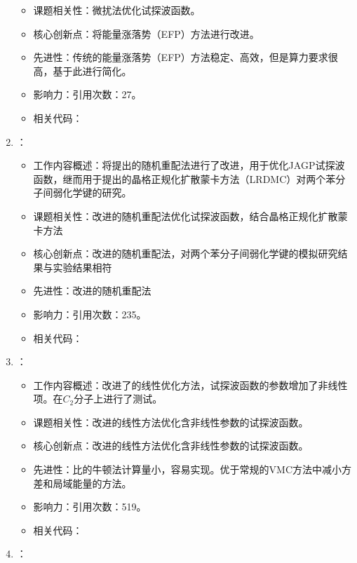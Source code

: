 \begin{enumerate}
\begin{itemize}
                \item 课题相关性：微扰法优化试探波函数。
                \item 核心创新点：将能量涨落势（EFP）方法进行改进。
                \item 先进性：传统的能量涨落势（EFP）方法稳定、高效，但是算力要求很高，基于此进行简化。
                \item 影响力：引用次数：27。
                \item 相关代码：
            \end{itemize}
        \item \citet{sorella2007weak}：
            \begin{itemize}
                \item 工作内容概述：将\citet{sorella2001generalized}提出的随机重配法进行了改进，用于优化JAGP试探波函数，继而用于\citet{casula2005diffusion}提出的晶格正规化扩散蒙卡方法（LRDMC）对两个苯分子间弱化学键的研究。
                \item 课题相关性：改进的随机重配法优化试探波函数，结合晶格正规化扩散蒙卡方法
                \item 核心创新点：改进的随机重配法，对两个苯分子间弱化学键的模拟研究结果与实验结果相符
                \item 先进性：改进的随机重配法
                \item 影响力：引用次数：235。
                \item 相关代码：
            \end{itemize}
        \item \citet{umrigar2007alleviation}：
            \begin{itemize}
                \item 工作内容概述：改进了\citet{nightingale2001optimization}的线性优化方法，试探波函数的参数增加了非线性项。在$C_2$分子上进行了测试。
                \item 课题相关性：改进的线性方法优化含非线性参数的试探波函数。
                \item 核心创新点：改进的线性方法优化含非线性参数的试探波函数。
                \item 先进性：比\citet{umrigar2005energy}的牛顿法计算量小，容易实现。优于常规的VMC方法中减小方差和局域能量的方法。
                \item 影响力：引用次数：519。
                \item 相关代码：
            \end{itemize}
        \item \citet{toulouse2007optimization}：

\end{enumerate}

